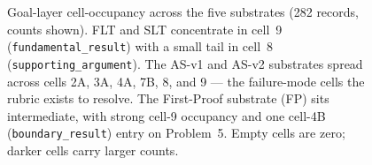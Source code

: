 \begin{figure}[t]
\caption{Goal-layer cell-occupancy across the five substrates (282 records,
counts shown). FLT and SLT concentrate in cell~9 (\texttt{fundamental\_result})
with a small tail in cell~8 (\texttt{supporting\_argument}). The AS-v1 and
AS-v2 substrates spread across cells 2A, 3A, 4A, 7B, 8, and 9 --- the
failure-mode cells the rubric exists to resolve. The First-Proof substrate
(FP) sits intermediate, with strong cell-9 occupancy and one cell-4B
(\texttt{boundary\_result}) entry on Problem~5. Empty cells are zero;
darker cells carry larger counts.}
\label{fig:cell_heatmap}
\end{figure}
